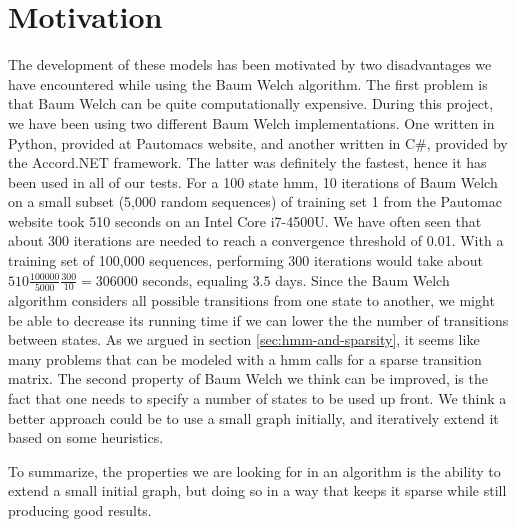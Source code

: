 \section{Motivation}
The development of these models has been motivated by two disadvantages we have encountered while using the Baum Welch algorithm.
The first problem is that Baum Welch can be quite computationally expensive.
During this project, we have been using two different Baum Welch implementations. One written in Python, provided at Pautomacs website, and another written in C\#, provided by the Accord.NET framework. The latter was definitely the fastest, hence it has been used in all of our tests.
For a 100 state \gls{hmm}, 10 iterations of Baum Welch on a small subset (5,000 random sequences) of training set 1 from the Pautomac website took 510 seconds on an Intel Core i7-4500U. We have often seen that about 300 iterations are needed to reach a convergence threshold of 0.01. With a training set of 100,000 sequences, performing 300 iterations would take about $510\frac{100000}{5000}\frac{300}{10} = 306000$ seconds, equaling $3.5$ days.
Since the Baum Welch algorithm considers all possible transitions from one state to another, we might be able to decrease its running time if we can lower the the number of transitions between states. As we argued in section \ref{sec:hmm-and-sparsity}, it seems like many problems that can be modeled with a \gls{hmm} calls for a sparse transition matrix.
The second property of Baum Welch we think can be improved, is the fact that one needs to specify a number of states to be used up front.
We think a better approach could be to use a small graph initially, and iteratively extend it based on some heuristics.

To summarize, the properties we are looking for in an algorithm is the ability to extend a small initial graph, but doing so in a way that keeps it sparse while still producing good results.